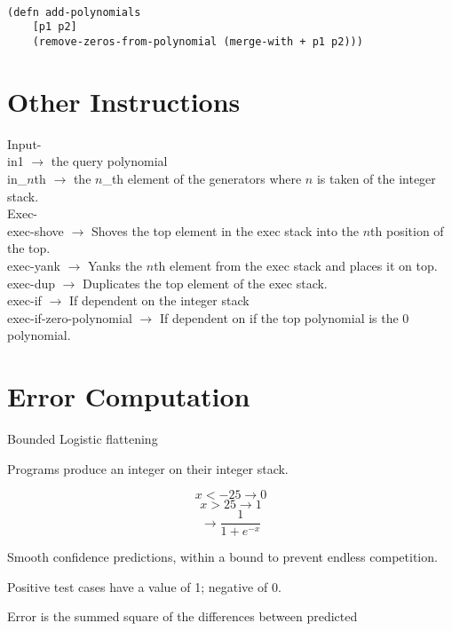 \documentclass[20pt]{extarticle}
\begin{document}
\begin{verbatim}

(defn add-polynomials
    [p1 p2]
    (remove-zeros-from-polynomial (merge-with + p1 p2)))

\end{verbatim}

\newpage
\section*{Other Instructions}

\noindent Input- \\
\indent in1 $\rightarrow$ the query polynomial \\
\indent in\_$n$th $\rightarrow$ the $n$\_th element of the generators where $n$ is taken of the integer stack. \\

\noindent Exec- \\
\indent exec-shove $\rightarrow$ Shoves the top element in the exec stack into the $n$th position of the top. \\
\indent exec-yank $\rightarrow$ Yanks the $n$th element from the exec stack and places it on top. \\
\indent exec-dup $\rightarrow$ Duplicates the top element of the exec stack. \\
\indent exec-if $\rightarrow$ If dependent on the integer stack \\
\indent exec-if-zero-polynomial $\rightarrow$ If dependent on if the top polynomial is the 0 polynomial. \\

\newpage
\section*{Error Computation}

\noindent Bounded Logistic flattening

\noindent Programs produce an integer on their integer stack. 

 $$x < -25 \rightarrow 0 $$
 $$x > 25  \rightarrow 1 $$
 $$\rightarrow \frac{1}{1+e^{-x}}$$

\noindent Smooth confidence predictions, within a bound to prevent endless competition. 

\noindent Positive test cases have a value of 1; negative of 0.

\noindent Error is the summed square of the differences between predicted 

\end{document}
